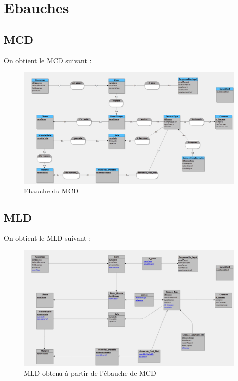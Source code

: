\documentclass[12pt,french,titlepage]{article}
\begin{document}
	    
	   \section{Ebauches}
	   
	   \subsection{MCD}
	   On obtient le MCD suivant :
    \begin{figure}[H]
	      \centering
	      \includegraphics[scale=0.23]{./ebauche_mcd.jpg}
	      \caption{Ebauche du MCD}
	      
	   
	      
	  \end{figure}
	  
	  \subsection{MLD}
	  
	  On obtient le MLD suivant :

    \begin{figure}[H]
	      \centering
	      \includegraphics[scale=0.23]{./ebauche_mld.jpg}
	      \caption{MLD obtenu à partir de l'ébauche de MCD}
	      
	   
	      
	  \end{figure}
    
\end{document}
